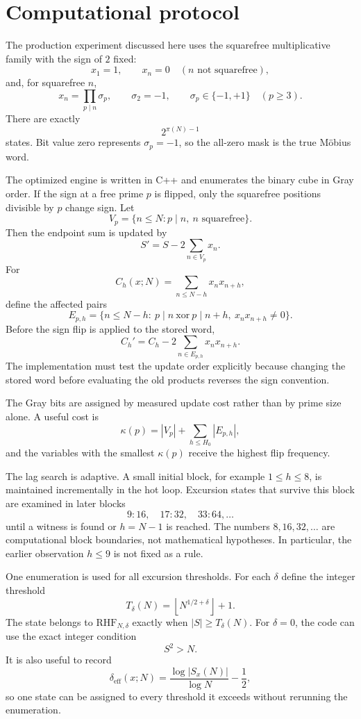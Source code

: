 \documentclass[11pt]{article}
\newcommand{\RHF}{\mathrm{RHF}}
\begin{document}
\section{Computational protocol}
The production experiment discussed here uses the squarefree multiplicative family with the sign of $2$ fixed:
\[
 x_1=1,
 \qquad
 x_n=0\quad(n\text{ not squarefree}),
\]
and, for squarefree $n$,
\[
 x_n=\prod_{p\mid n}\sigma_p,
 \qquad
 \sigma_2=-1,
 \qquad
 \sigma_p\in\{-1,+1\}\quad(p\ge3).
\]
There are exactly
\[
 2^{\pi(N)-1}
\]
states. Bit value zero represents $\sigma_p=-1$, so the all-zero mask is the true Möbius word.

The optimized engine is written in C++ and enumerates the binary cube in Gray order. If the sign at a free prime $p$ is flipped, only the squarefree positions divisible by $p$ change sign. Let
\[
 V_p=\{n\le N:p\mid n,\ n\text{ squarefree}\}.
\]
Then the endpoint sum is updated by
\[
 S' = S-2\sum_{n\in V_p}x_n.
\]
For
\[
 C_h(x;N)=\sum_{n\le N-h}x_nx_{n+h},
\]
define the affected pairs
\[
 E_{p,h}=\{n\le N-h:\ p\mid n\ \mathrm{xor}\ p\mid n+h,\ x_nx_{n+h}\ne0\}.
\]
Before the sign flip is applied to the stored word,
\[
 C_h'=C_h-2\sum_{n\in E_{p,h}}x_nx_{n+h}.
\]
The implementation must test the update order explicitly because changing the stored word before evaluating the old products reverses the sign convention.

The Gray bits are assigned by measured update cost rather than by prime size alone. A useful cost is
\[
 \kappa(p)=|V_p|+\sum_{h\le H_0}|E_{p,h}|,
\]
and the variables with the smallest $\kappa(p)$ receive the highest flip frequency.

The lag search is adaptive. A small initial block, for example $1\le h\le8$, is maintained incrementally in the hot loop. Excursion states that survive this block are examined in later blocks
\[
 9{:}16,\quad17{:}32,\quad33{:}64,\ldots
\]
until a witness is found or $h=N-1$ is reached. The numbers $8,16,32,\ldots$ are computational block boundaries, not mathematical hypotheses. In particular, the earlier observation $h\le9$ is not fixed as a rule.

One enumeration is used for all excursion thresholds. For each $\delta$ define the integer threshold
\[
 T_\delta(N)=\left\lfloor N^{1/2+\delta}\right\rfloor+1.
\]
The state belongs to $\RHF_{N,\delta}$ exactly when $|S|\ge T_\delta(N)$. For $\delta=0$, the code can use the exact integer condition
\[
 S^2>N.
\]
It is also useful to record
\[
 \delta_{\mathrm{eff}}(x;N)
 =\frac{\log|S_x(N)|}{\log N}-\frac12,
\]
so one state can be assigned to every threshold it exceeds without rerunning the enumeration.
\end{document}
